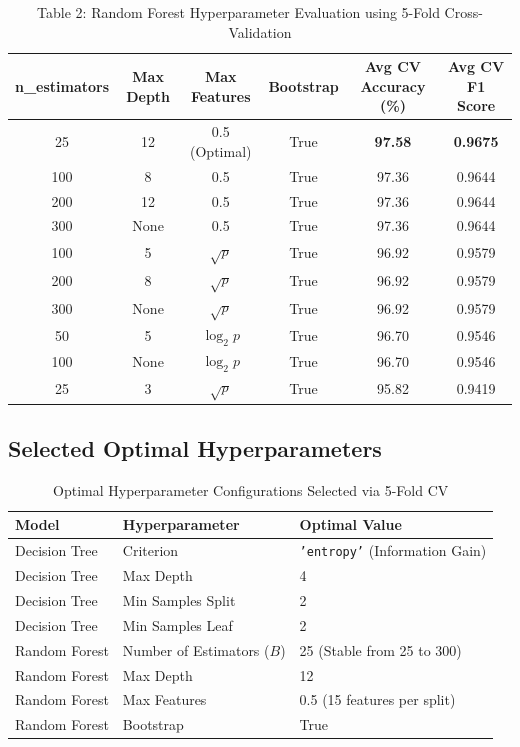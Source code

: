 \documentclass[12pt,a4paper]{article}
\begin{document}
\begin{table}[H]
\centering
\small
\begin{tabular}{cccccc}
\toprule
\textbf{n\_estimators} & \textbf{Max Depth} & \textbf{Max Features} & \textbf{Bootstrap} & \textbf{Avg CV Accuracy (\%)} & \textbf{Avg CV F1 Score} \\
\midrule
25 & 12 & 0.5 (Optimal) & True & \textbf{97.58} & \textbf{0.9675} \\
100 & 8 & 0.5 & True & 97.36 & 0.9644 \\
200 & 12 & 0.5 & True & 97.36 & 0.9644 \\
300 & None & 0.5 & True & 97.36 & 0.9644 \\
100 & 5 & $\sqrt{p}$ & True & 96.92 & 0.9579 \\
200 & 8 & $\sqrt{p}$ & True & 96.92 & 0.9579 \\
300 & None & $\sqrt{p}$ & True & 96.92 & 0.9579 \\
50 & 5 & $\log_2 p$ & True & 96.70 & 0.9546 \\
100 & None & $\log_2 p$ & True & 96.70 & 0.9546 \\
25 & 3 & $\sqrt{p}$ & True & 95.82 & 0.9419 \\
\bottomrule
\end{tabular}
\caption{Table 2: Random Forest Hyperparameter Evaluation using 5-Fold Cross-Validation}
\end{table}

\subsection{Selected Optimal Hyperparameters}
\begin{table}[H]
\centering
\begin{tabular}{lll}
\toprule
\textbf{Model} & \textbf{Hyperparameter} & \textbf{Optimal Value} \\
\midrule
Decision Tree & Criterion & \texttt{'entropy'} (Information Gain) \\
Decision Tree & Max Depth & 4 \\
Decision Tree & Min Samples Split & 2 \\
Decision Tree & Min Samples Leaf & 2 \\
\midrule
Random Forest & Number of Estimators ($B$) & 25 (Stable from 25 to 300) \\
Random Forest & Max Depth & 12 \\
Random Forest & Max Features & 0.5 (15 features per split) \\
Random Forest & Bootstrap & True \\
\bottomrule
\end{tabular}
\caption{Optimal Hyperparameter Configurations Selected via 5-Fold CV}
\end{table}
\end{document}
